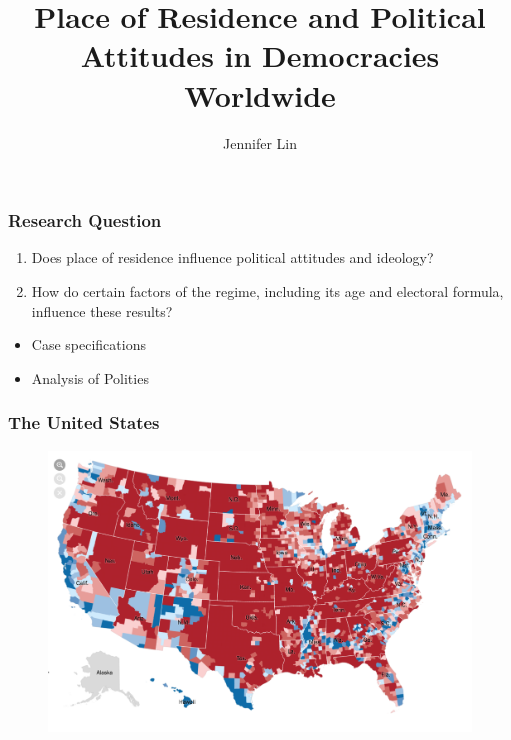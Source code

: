\documentclass[20pt]{beamer}
\begin{document}
	\author{Jennifer Lin}
	\title{Place of Residence and Political Attitudes in Democracies Worldwide}
	\begin{frame}[plain]
	\maketitle
\end{frame}

\begin{frame}
\frametitle{Research Question}
\begin{enumerate}
	\item Does place of residence influence political attitudes and ideology? 
	\item How do certain factors of the regime, including its age and electoral formula, influence these results?
\end{enumerate}
\end{frame}

\begin{frame}
\begin{itemize}
\frametitle{Literature}
\item Case specifications 
\item Analysis of Polities
\end{itemize}
\end{frame}

\begin{frame}
\frametitle{The United States}
\begin{figure}[H]    \centering
	{	 \includegraphics[width=\textwidth]{NYT}}
\end{figure}
\end{frame}
\end{document}
